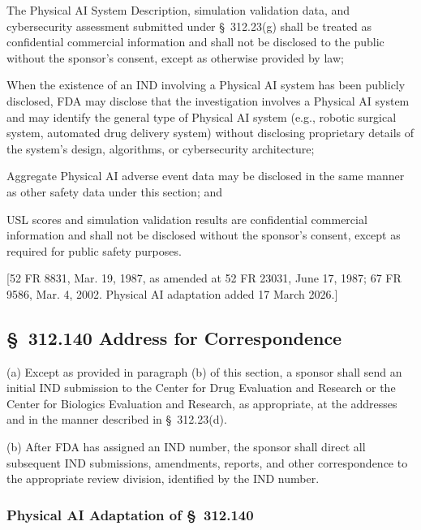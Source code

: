 \begin{description}[leftmargin=0.8cm,style=sameline]
\item[(i)] The Physical AI System Description, simulation validation data, and cybersecurity assessment submitted under \S~312.23(g) shall be treated as confidential commercial information and shall not be disclosed to the public without the sponsor's consent, except as otherwise provided by law;
\item[(ii)] When the existence of an IND involving a Physical AI system has been publicly disclosed, FDA may disclose that the investigation involves a Physical AI system and may identify the general type of Physical AI system (e.g., robotic surgical system, automated drug delivery system) without disclosing proprietary details of the system's design, algorithms, or cybersecurity architecture;
\item[(iii)] Aggregate Physical AI adverse event data may be disclosed in the same manner as other safety data under this section; and
\item[(iv)] USL scores and simulation validation results are confidential commercial information and shall not be disclosed without the sponsor's consent, except as required for public safety purposes.
\end{description}

[52 FR 8831, Mar. 19, 1987, as amended at 52 FR 23031, June 17, 1987; 67 FR 9586, Mar. 4, 2002. Physical AI adaptation added 17 March 2026.]

\subsection{\S~312.140 Address for Correspondence}

(a) Except as provided in paragraph (b) of this section, a sponsor shall send an initial IND submission to the Center for Drug Evaluation and Research or the Center for Biologics Evaluation and Research, as appropriate, at the addresses and in the manner described in \S~312.23(d).

(b) After FDA has assigned an IND number, the sponsor shall direct all subsequent IND submissions, amendments, reports, and other correspondence to the appropriate review division, identified by the IND number.

\subsubsection{Physical AI Adaptation of \S~312.140}

